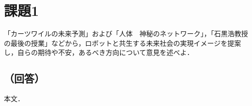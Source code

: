 \section*{課題1}
「カーツワイルの未来予測」および「人体　神秘のネットワーク」，「石黒浩教授の最後の授業」などから，ロボットと共生する未来社会の実現イメージを提案し，自らの期待や不安，あるべき方向について意見を述べよ．

\subsection*{（回答）}
本文．
